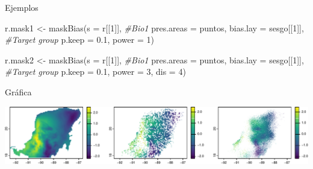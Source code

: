 \documentclass[
  11pt,
  ignorenonframetext,
]{beamer}
\newenvironment{Shaded}{}{}
\newcommand{\AttributeTok}[1]{\textcolor[rgb]{0.49,0.56,0.16}{#1}}
\newcommand{\CommentTok}[1]{\textcolor[rgb]{0.38,0.63,0.69}{\textit{#1}}}
\newcommand{\DecValTok}[1]{\textcolor[rgb]{0.25,0.63,0.44}{#1}}
\newcommand{\FloatTok}[1]{\textcolor[rgb]{0.25,0.63,0.44}{#1}}
\newcommand{\FunctionTok}[1]{\textcolor[rgb]{0.02,0.16,0.49}{#1}}
\newcommand{\NormalTok}[1]{#1}
\newcommand{\OtherTok}[1]{\textcolor[rgb]{0.00,0.44,0.13}{#1}}
\begin{document}
\begin{frame}[fragile]{Ejemplos}
\protect\hypertarget{ejemplos}{}
\begin{Shaded}
\begin{Highlighting}[]
\NormalTok{r.mask1 }\OtherTok{\textless{}{-}} \FunctionTok{maskBias}\NormalTok{(}\AttributeTok{s =}\NormalTok{ r[[}\DecValTok{1}\NormalTok{]], }\CommentTok{\#Bio1}
                   \AttributeTok{pres.areas =}\NormalTok{ puntos, }
                   \AttributeTok{bias.lay =}\NormalTok{ sesgo[[}\DecValTok{1}\NormalTok{]], }\CommentTok{\#Target group}
                   \AttributeTok{p.keep =} \FloatTok{0.1}\NormalTok{, }\AttributeTok{power =} \DecValTok{1}\NormalTok{)}

\NormalTok{r.mask2 }\OtherTok{\textless{}{-}} \FunctionTok{maskBias}\NormalTok{(}\AttributeTok{s =}\NormalTok{ r[[}\DecValTok{1}\NormalTok{]], }\CommentTok{\#Bio1}
                   \AttributeTok{pres.areas =}\NormalTok{ puntos, }
                   \AttributeTok{bias.lay =}\NormalTok{ sesgo[[}\DecValTok{1}\NormalTok{]], }\CommentTok{\#Target group}
                   \AttributeTok{p.keep =} \FloatTok{0.1}\NormalTok{, }\AttributeTok{power =} \DecValTok{3}\NormalTok{, }\AttributeTok{dis =} \DecValTok{4}\NormalTok{)}
\end{Highlighting}
\end{Shaded}
\end{frame}

\begin{frame}{Gráfica}
\protect\hypertarget{gruxe1fica-1}{}
\begin{center}\includegraphics{Tutorial-spatstat-2_files/figure-beamer/unnamed-chunk-25-1} \end{center}
\end{frame}
\end{document}
